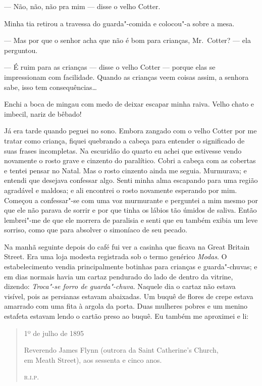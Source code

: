 --- Não, não, não pra mim --- disse o velho Cotter.

Minha tia retirou a travessa do guarda"-comida e colocou"-a sobre a mesa.

--- Mas por que o senhor acha que não é bom para crianças, Mr.~Cotter?  ---
ela perguntou.

--- É ruim para as crianças --- disse o velho Cotter --- porque elas se
impressionam com facilidade.  Quando as crianças veem coisas assim, a senhora
sabe, isso tem consequências\ldots{}

Enchi a boca de mingau com medo de deixar escapar minha raiva.  Velho chato e
imbecil, nariz de bêbado!

Já era tarde quando peguei no sono.  Embora zangado com o velho Cotter por me
tratar como criança, fiquei quebrando a cabeça para entender o significado de
suas frases incompletas.  Na escuridão do quarto eu achei que estivesse vendo
novamente o rosto grave e cinzento do paralítico.  Cobri a cabeça com as
cobertas e tentei pensar no Natal.  Mas o rosto cinzento ainda me seguia.
Murmurava; e entendi que desejava confessar algo.  Senti minha alma escapando
para uma região agradável e maldosa; e ali encontrei o rosto novamente
esperando por mim.  Começou a confessar"-se com uma voz murmurante e perguntei a
mim mesmo por que ele não parava de sorrir e por que tinha os lábios tão úmidos
de saliva.  Então lembrei"-me de que ele morrera de paralisia e senti que eu
também exibia um leve sorriso, como que para absolver o simoníaco de seu
pecado.

Na manhã seguinte depois do café fui ver a casinha que ficava na Great Britain
Street.  Era uma loja modesta registrada sob o termo genérico \textit{Modas}.
O estabelecimento vendia principalmente botinhas para crianças e guarda"-chuvas;
e em dias normais havia um cartaz pendurado do lado de dentro da vitrine,
dizendo: \textit{Troca"-se forro de guarda"-chuva}.  Naquele dia o cartaz não
estava visível, pois as persianas estavam abaixadas.  Um buquê de flores de
crepe estava amarrado com uma fita à argola da porta.  Duas mulheres pobres e
um menino estafeta estavam lendo o cartão preso ao buquê.  Eu também me
aproximei e li:

\begin{quote}\centering
1º de julho de 1895\smallskip

Reverendo James Flynn (outrora da Saint Catherine’s Church,\\
em Meath Street), aos sessenta e cinco anos.

\scshape r.i.p.
\end{quote}

